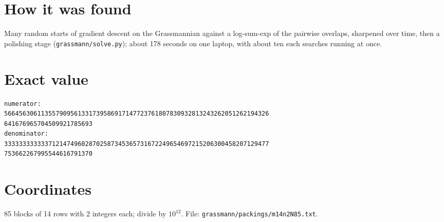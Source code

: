 \documentclass[11pt,a4paper]{article}
\begin{document}
\section{How it was found}
Many random starts of gradient descent on the Grassmannian against a log-sum-exp of the pairwise overlaps, sharpened over time, then a polishing stage (\texttt{grassmann/solve.py}); about 178 seconds on one laptop, with about ten such searches running at once.


\appendix
\section{Exact value}
{\small
\begin{verbatim}
numerator:
566456306113557909561331739586917147723761807830932813243262051262194326
641676965704509921785693
denominator:
333333333333712147496028702587345365731672249654697215206300458207129477
753662267995544616791370
\end{verbatim}}

\section{Coordinates}
85 blocks of 14 rows with 2 integers each; divide by $10^{12}$. File: \texttt{grassmann/packings/m14n2N85.txt}.
{\tiny
\begin{multicols}{4}
\end{multicols}}
\end{document}
